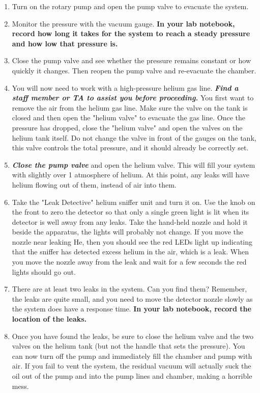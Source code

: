 \begin{enumerate}
\item Turn on the rotary pump and open the pump valve to evacuate the system.

\item Monitor the pressure with the vacuum gauge. {\bf In your lab notebook, record how long it takes for the system to reach a steady pressure and how low that pressure is.}

\item Close the pump valve and see whether the pressure remains constant or how quickly it changes. Then reopen the pump valve and re-evacuate the chamber.

\item You will now need to work with a high-pressure helium gas line. {\bf \textit{Find a staff member or TA to assist you before proceeding.}} You first want to remove the air from the helium gas line. Make sure the valve on the tank is closed and then open the "helium valve" to evacuate the gas line. Once the pressure has dropped, close the "helium valve" and open the valves on the helium tank itself. Do not change the valve in front of the gauges on the tank, this valve controls the total pressure, and it should already be correctly set.

\item {\bf \textit{Close the pump valve}} and open the helium valve. This will fill your system with slightly over 1 atmosphere of helium. At this point, any leaks will have helium flowing out of them, instead of air into them.

\item Take the "Leak Detective" helium sniffer unit and turn it on. Use the knob on the front to zero the detector so that only a single green light is lit when its detector is well away from any leaks. Take the hand-held nozzle and hold it beside the apparatus, the lights will probably not change. If you move the nozzle near leaking He, then you should see the red LEDs light up indicating that the sniffer has detected excess helium in the air, which is a leak. When you move the nozzle away from the leak and wait for a few seconds the red lights should go out. 

\item There are at least two leaks in the system. Can you find them? Remember, the leaks are quite small, and you need to move the detector nozzle slowly as the system does have a response time. {\bf In your lab notebook, record the location of the leaks.}

\item Once you have found the leaks, be sure to close the helium valve and the two valves on the helium tank (but not the handle that sets the pressure). You can now turn off the pump and immediately fill the chamber and pump with air. If you fail to vent the system, the residual vacuum will actually suck the oil out of the pump and into the pump lines and chamber, making a horrible mess.

\end{enumerate}

